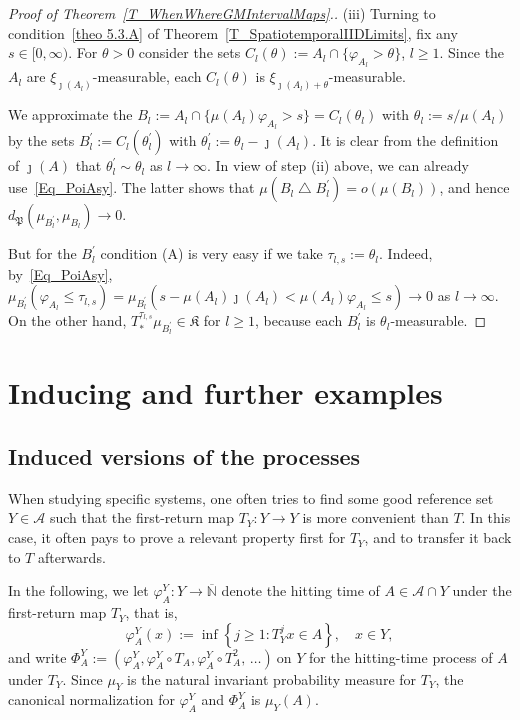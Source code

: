 \documentclass[10pt]{amsart}
\theoremstyle{definition}\newtheorem{defi}[theo]{Definition}\newtheorem{rema}[theo]{Remark}\newtheorem{exam}[theo]{Example}\newtheorem{exem}[theo]{Example}\newtheorem{nota}[theo]{Notation}
\newcommand{\clA}{\mathcal{A}}
\newcommand{\frkK}{\mathfrak{K}}
\newcommand{\frkP}{\mathfrak{P}}
\newcommand{\bbN}{\mathbb{N}}
\begin{document}
\begin{proof}[{Proof of Theorem~\ref{T_WhenWhereGMIntervalMaps}.}]
\vspace{6pt}
\noindent(iii) Turning to condition~\eqref{theo 5.3.A} of Theorem~\ref{T_SpatiotemporalIIDLimits}, fix any $s\in\lbrack0,\infty)$. For $\theta>0$ consider the sets $C_{l}(\theta):=A_{l}\cap\{\varphi_{A_{l}} >\theta\} $, $l\geq1$. Since the $A_{l}$ are $\xi_{\jmath(A_{l})}$-measurable, each $C_{l}(\theta)$ is $\xi_{\jmath(A_{l})+\theta}$-measurable.

We approximate the $B_{l}:=A_{l}\cap\{\mu(A_{l})\varphi_{A_{l}}>s\}=C_{l} (\theta_{l})$ with $\theta_{l}:=s/\mu(A_{l})$ by the sets $B_{l}^{\prime }:=C_{l}(\theta_{l}^{\prime})$ with $\theta_{l}^{\prime}:=\theta_{l} -\jmath(A_{l})$. It is clear from the definition of $\jmath(A)$ that $\theta_{l}^{\prime}\sim\theta_{l}$ as $l\rightarrow\infty$. In view of step (ii) above, we can already use~\eqref{Eq_PoiAsy}. The latter shows that $\mu(B_{l}\bigtriangleup B_{l}^{\prime})=o(\mu(B_{l}))$, and hence $d_{\frkP}(\mu_{B_{l}^{\prime}},\mu_{B_{l}})\rightarrow0$.

But for the $B_{l}^{\prime}$ condition (A) is very easy if we take $\tau _{l,s}:=\theta_{l}$. Indeed, by~\eqref{Eq_PoiAsy}, $\mu_{B_{l}^{\prime} }(\varphi_{A_{l}}\leq\tau_{l,s})=\mu_{B_{l}^{\prime}}(s-\mu(A_{l})\jmath (A_{l})<\mu(A_{l})\varphi_{A_{l}}\leq s)\rightarrow0$ as $l\rightarrow\infty$. On the other hand, $T_{\ast}^{\tau_{l,s}}\mu_{B_{l}^{\prime}}\in\frkK$ for $l\geq1$, because each $B_{l}^{\prime}$ is $\theta_{l}$-measurable.
\end{proof}




\section{Inducing and further examples}

\subsection{Induced versions of the processes}
When studying specific systems, one often tries to find some good reference set $Y\in\clA$ such that the first-return map $T_{Y}:Y\rightarrow Y$ is more convenient than $T$. In this case, it often pays to prove a relevant property first for $T_{Y}$, and to transfer it back to $T$ afterwards.

In the following, we let $\varphi_{A}^{Y}:Y\rightarrow\overline{\bbN} $ denote the hitting time of $A\in\clA\cap Y$ under the first-return map $T_{Y}$, that is,
\begin{equation}
\varphi_{A}^{Y}(x):=\inf\left\{j\geq1:T_{Y}^{j}x\in A\right\},\quad x\in Y,
\end{equation}
and write $\Phi_{A}^{Y}:=(\varphi_{A}^{Y},\varphi_{A}^{Y}\circ T_{A},\varphi_{A}^{Y}\circ T_{A}^{2},\,\ldots)\ $on $Y$ for the hitting-time process of $A$ under $T_{Y}$. Since $\mu_{Y}$ is the natural invariant probability measure for $T_{Y}$, the canonical normalization for $\varphi_{A}^{Y}$ and $\Phi_{A}^{Y}$ is $\mu_{Y}(A)$.
\end{document}
